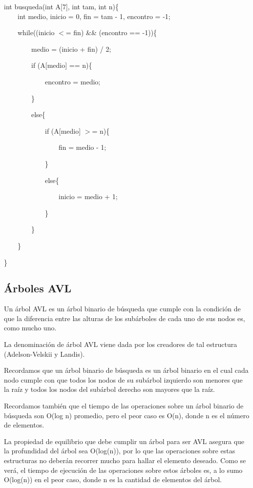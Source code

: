 {
\ttfamily
int busqueda(int A[7], int tam, int n)\{\\

\noindent \ \ \ \ int medio, inicio = 0, fin = tam - 1, encontro = -1;

\noindent \ \ \ \ while((inicio $<$= fin) \&\& (encontro == -1))\{

\noindent \ \ \ \ \ \ \ \ medio = (inicio + fin) / 2;

\noindent \ \ \ \ \ \ \ \ if (A[medio] == n)\{

\noindent \ \ \ \ \ \ \ \ \ \ \ \ encontro = medio;

\noindent \ \ \ \ \ \ \ \ \}

\noindent \ \ \ \ \ \ \ \ else\{

\noindent \ \ \ \ \ \ \ \ \ \ \ \ if (A[medio] $>$= n)\{

\noindent \ \ \ \ \ \ \ \ \ \ \ \ \ \ \ \ fin = medio - 1;

\noindent \ \ \ \ \ \ \ \ \ \ \ \ \}

\noindent \ \ \ \ \ \ \ \ \ \ \ \ else\{

\noindent \ \ \ \ \ \ \ \ \ \ \ \ \ \ \ \ inicio = medio + 1;

\noindent \ \ \ \ \ \ \ \ \ \ \ \ \}

\noindent \ \ \ \ \ \ \ \ \}

\noindent \ \ \ \ \}

\noindent \}
}


\subsection{Árboles AVL}

Un árbol AVL es un árbol binario de búsqueda que cumple con la condición de que la diferencia entre las alturas de los subárboles de cada uno de sus nodos es, como mucho uno.

La denominación de árbol AVL viene dada por los creadores de tal estructura (Adelson-Velskii y Landis).

Recordamos que un árbol binario de búsqueda es un árbol binario en el cual cada nodo cumple con que todos los nodos de su subárbol izquierdo son menores que la raíz y todos los nodos del subárbol derecho son mayores que la raíz.

Recordamos también que el tiempo de las operaciones sobre un árbol binario de búsqueda son O(log n) promedio, pero el peor caso es O(n), donde n es el número de elementos.

La propiedad de equilibrio que debe cumplir un árbol para ser AVL asegura que la profundidad del árbol sea O(log(n)), por lo que las operaciones sobre estas estructuras no deberán recorrer mucho para hallar el elemento deseado. Como se verá, el tiempo de ejecución de las operaciones sobre estos árboles es, a lo sumo O(log(n)) en el peor caso, donde n es la cantidad de elementos del árbol.

